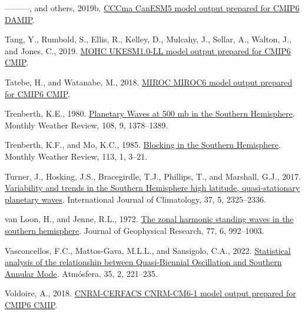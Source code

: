 \documentclass[12pt,oneside]{reedthesis}
\newlength{\cslhangindent}
\newenvironment{CSLReferences}[2] %
 {%
  \setlength{\parindent}{0pt}
  \ifodd #1 \everypar{\setlength{\hangindent}{\cslhangindent}}\ignorespaces\fi
  \ifnum #2 > 0
  \setlength{\parskip}{#2\baselineskip}
  \fi
 }%
 {}
\begin{document}
\begin{CSLReferences}{1}{0}
\leavevmode{}%
---------, and others, 2019b. \href{https://doi.org/10.22033/ESGF/CMIP6.1305}{CCCma CanESM5 model output prepared for CMIP6 DAMIP}.

\leavevmode{}%
Tang, Y., Rumbold, S., Ellis, R., Kelley, D., Mulcahy, J., Sellar, A., Walton, J., and Jones, C., 2019. \href{https://doi.org/10.22033/ESGF/CMIP6.1569}{MOHC UKESM1.0-LL model output prepared for CMIP6 CMIP}.

\leavevmode{}%
Tatebe, H., and Watanabe, M., 2018. \href{https://doi.org/10.22033/ESGF/CMIP6.881}{MIROC MIROC6 model output prepared for CMIP6 CMIP}.

\leavevmode{}%
Trenberth, K.E., 1980. \href{https://doi.org/10.1175/1520-0493(1980)108\%3C1378:PWAMIT\%3E2.0.CO;2}{Planetary {Waves} at 500 mb in the {Southern Hemisphere}}. Monthly Weather Review, 108, 9, 1378--1389.

\leavevmode{}%
Trenberth, K.F., and Mo, K.C., 1985. \href{https://doi.org/10.1175/1520-0493(1985)113\%3C0003:BITSH\%3E2.0.CO;2}{Blocking in the {Southern Hemisphere}}. Monthly Weather Review, 113, 1, 3--21.

\leavevmode{}%
Turner, J., Hosking, J.S., Bracegirdle, T.J., Phillips, T., and Marshall, G.J., 2017. \href{https://doi.org/10.1002/joc.4848}{Variability and trends in the {Southern Hemisphere} high latitude, quasi-stationary planetary waves}. International Journal of Climatology, 37, 5, 2325--2336.

\leavevmode{}%
van Loon, H., and Jenne, R.L., 1972. \href{https://doi.org/10.1029/JC077i006p00992}{The zonal harmonic standing waves in the southern hemisphere}. Journal of Geophysical Research, 77, 6, 992--1003.

\leavevmode{}%
Vasconcellos, F.C., Mattos-Gava, M.L.L., and Sansigolo, C.A., 2022. \href{https://doi.org/10.20937/ATM.52910}{Statistical analysis of the relationship between {Quasi-Biennial Oscillation} and {Southern Annular Mode}}. Atmósfera, 35, 2, 221--235.

\leavevmode{}%
Voldoire, A., 2018. \href{https://doi.org/10.22033/ESGF/CMIP6.1375}{CNRM-CERFACS CNRM-CM6-1 model output prepared for CMIP6 CMIP}.


\end{CSLReferences}
\end{document}
